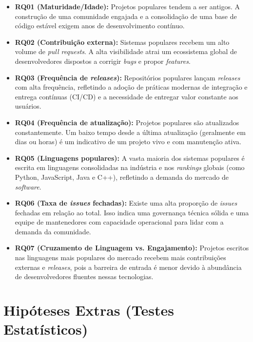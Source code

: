 \documentclass[
	article,			%
	11pt,				%
	oneside,			%
	a4paper,			%
	english,			%
	brazil,				%
	sumario=tradicional
	]{abntex2}
\begin{document}
\begin{itemize}
    \item \textbf{RQ01 (Maturidade/Idade):} Projetos populares tendem a ser antigos. A construção de uma comunidade engajada e a consolidação de uma base de código estável exigem anos de desenvolvimento contínuo.
    
    \item \textbf{RQ02 (Contribuição externa):} Sistemas populares recebem um alto volume de \textit{pull requests}. A alta visibilidade atrai um ecossistema global de desenvolvedores dispostos a corrigir \textit{bugs} e propor \textit{features}.
    
    \item \textbf{RQ03 (Frequência de \textit{releases}):} Repositórios populares lançam \textit{releases} com alta frequência, refletindo a adoção de práticas modernas de integração e entrega contínuas (CI/CD) e a necessidade de entregar valor constante aos usuários.
    
    \item \textbf{RQ04 (Frequência de atualização):} Projetos populares são atualizados constantemente. Um baixo tempo desde a última atualização (geralmente em dias ou horas) é um indicativo de um projeto vivo e com manutenção ativa.
    
    \item \textbf{RQ05 (Linguagens populares):} A vasta maioria dos sistemas populares é escrita em linguagens consolidadas na indústria e nos \textit{rankings} globais (como Python, JavaScript, Java e C++), refletindo a demanda do mercado de \textit{software}.
    
    \item \textbf{RQ06 (Taxa de \textit{issues} fechadas):} Existe uma alta proporção de \textit{issues} fechadas em relação ao total. Isso indica uma governança técnica sólida e uma equipe de mantenedores com capacidade operacional para lidar com a demanda da comunidade.
    
    \item \textbf{RQ07 (Cruzamento de Linguagem vs. Engajamento):} Projetos escritos nas linguagens mais populares do mercado recebem mais contribuições externas e \textit{releases}, pois a barreira de entrada é menor devido à abundância de desenvolvedores fluentes nessas tecnologias.
\end{itemize}

\section{Hipóteses Extras (Testes Estatísticos)}
\label{sec:hipoteses_extras}
\end{document}
